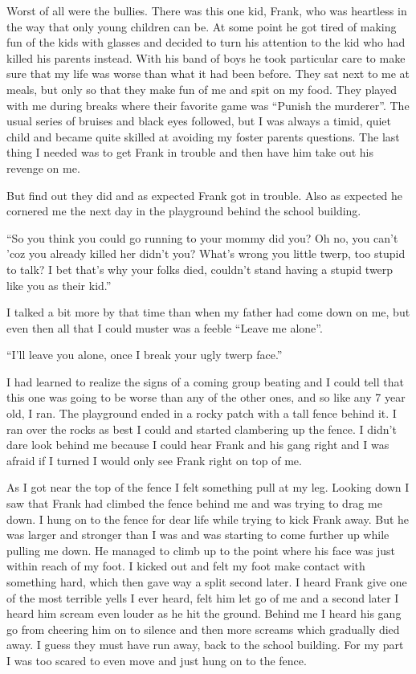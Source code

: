 \documentclass[11pt,letterpaper]{article}
\begin{document}
Worst of all were the bullies. There was this one kid, Frank, who was heartless in the way that only young children can be. At some point he got tired of making fun of the kids with glasses and decided to turn his attention to the kid who had killed his parents instead. With his band of boys he took particular care to make sure that my life was worse than what it had been before. They sat next to me at meals, but only so that they make fun of me and spit on my food. They played with me during breaks where their favorite game was ``Punish the murderer''. The usual series of bruises and black eyes followed, but I was always a timid, quiet child and became quite skilled at avoiding my foster parents questions. The last thing I needed was to get Frank in trouble and then have him take out his revenge on me.

But find out they did and as expected Frank got in trouble. Also as expected he cornered me the next day in the playground behind the school building.

``So you think you could go running to your mommy did you? Oh no, you can't 'coz you already killed her didn't you? What's wrong you little twerp, too stupid to talk? I bet that's why your folks died, couldn't stand having a stupid twerp like you as their kid.''

I talked a bit more by that time than when my father had come down on me, but even then all that I could muster was a feeble  ``Leave me alone''.

``I'll leave you alone, once I break your ugly twerp face.''

I had learned to realize the signs of a coming group beating and I could tell that this one was going to be worse than any of the other ones, and so like any 7 year old, I ran. The playground ended in a rocky patch with a tall fence behind it. I ran over the rocks as best I could and started clambering up the fence. I didn't dare look behind me because I could hear Frank and his gang right and I was afraid if I turned I would only see Frank right on top of me.

As I got near the top of the fence I felt something pull at my leg. Looking down I saw that Frank had climbed the fence behind me and was trying to drag me down. I hung on to the fence for dear life while trying to kick Frank away. But he was larger and stronger than I was and was starting to come further up while pulling me down. He managed to climb up to the point where his face was just within reach of my foot. I kicked out and felt my foot make contact with something hard, which then gave way a split second later. I heard Frank give one of the most terrible yells I ever heard, felt him let go of me and a second later I heard him scream even louder as he hit the ground. Behind me I heard his gang go from cheering him on to silence and then more screams which gradually died away. I guess they must have run away, back to the school building. For my part I was too scared to even move and just hung on to the fence.
\end{document}
